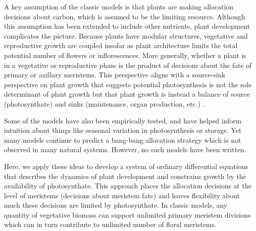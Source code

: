 \documentclass[12pt, oneside]{article}   	%
\begin{document}

A key assumption of the classic models is that plants are making allocation decisions about carbon, which is assumed to be the limiting resource. Although this assumption has been extended to include other nutrients, plant development complicates the picture. Because plants have modular structures, vegetative and reproductive growth are coupled insofar as plant architecture limits the total potential number of flowers or inflorescences. More generally, whether a plant is in a vegetative or reproductive phase is the product of decisions about the fate of primary or axillary meristems. This perspective aligns with a source-sink perspective on plant growth that suggests potential photosynthesis is not the sole determinant of plant growth but that plant growth is instead a balance of source (photosynthate) and sinks (maintenance, organ production, etc.) \cite{korner2015,rees2016}.

Some of the models have also been empirically tested, and have helped inform intuition about things like seasonal variation in photosynthesis or storage. Yet many models continue to predict a bang-bang allocation strategy which is not observed in many natural systems.  However, no such models have been written.

Here, we apply these ideas to develop a system of ordinary differential equations that describes the dynamics of plant development and constrains growth by the availability of photosynthate. This approach places the allocation decisions at the level of meristems (decisions about meristem fate) and leaves flexibility about much these decisions are limited by photosynthate. In classic models, any quantity of vegetative biomass can support unlimited primary meristem divisions which can in turn  contribute to unlimited number of floral meristems.
\end{document}
